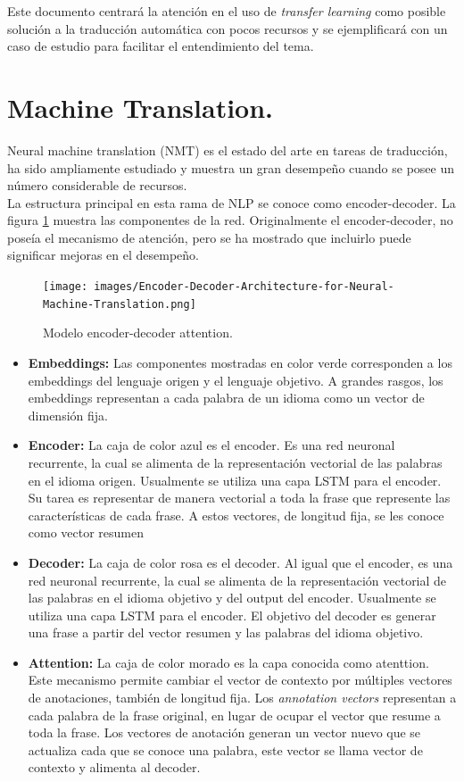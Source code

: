 \documentclass[12pt, letterpaper]{article}
\begin{document}
Este documento centrará la atención en el uso de \emph{transfer learning} como posible solución a la traducción automática con pocos recursos y se ejemplificará con un caso de estudio para facilitar el entendimiento del tema.


\pagebreak
\section{Machine Translation.}
Neural machine translation (NMT) es el estado del arte en tareas de traducción, ha sido ampliamente estudiado y muestra un gran desempeño cuando se posee un número considerable de recursos.\\

La estructura principal en esta rama de NLP se conoce como encoder-decoder. La figura \ref{e-d} muestra las componentes de la red. Originalmente el encoder-decoder, no poseía el mecanismo de atención, pero se ha mostrado que incluirlo puede significar mejoras en el desempeño.

\begin{figure}[h]
\centering
\texttt{[image: images/Encoder-Decoder-Architecture-for-Neural-Machine-Translation.png]} 
\label{e-d}
\caption{Modelo encoder-decoder attention.}
\end{figure}

\begin{itemize}
\item \textbf{Embeddings:} Las componentes mostradas en color verde corresponden a los embeddings del lenguaje origen y el lenguaje objetivo. A grandes rasgos, los embeddings representan a cada palabra de un idioma como un vector de dimensión fija.
\item \textbf{Encoder:} La caja de color azul es el encoder. Es una red neuronal recurrente, la cual se alimenta de la representación vectorial de las palabras en el idioma origen. Usualmente se utiliza una capa LSTM para el encoder. Su tarea es representar de manera vectorial a toda la frase que represente las características de cada frase. A estos vectores, de longitud fija, se les conoce como vector resumen

\item \textbf{Decoder:} La caja de color rosa es el decoder. Al igual que el encoder, es una red neuronal recurrente, la cual se alimenta de la representación vectorial de las palabras en el idioma objetivo y del output del encoder. Usualmente se utiliza una capa LSTM para el encoder. El objetivo del decoder es generar una frase a partir del vector resumen y las palabras del idioma objetivo.

\item \textbf{Attention:} La caja de color morado es la capa conocida como atenttion. Este mecanismo permite cambiar el vector de contexto por múltiples vectores de anotaciones, también de longitud fija. Los \emph{annotation vectors} representan a cada palabra de la frase original, en lugar de ocupar el vector que resume a toda la frase. Los vectores de anotación generan un vector nuevo que se actualiza cada que se conoce una palabra, este vector se llama vector de contexto y alimenta al decoder.

\end{itemize}
\end{document}

